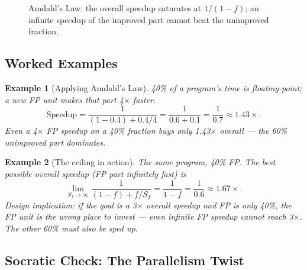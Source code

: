 \documentclass[11pt]{article}
\newtheorem{example}{Example}[section]
\begin{document}
\begin{figure}[h]
  \centering
  \caption{Amdahl's Law: the overall speedup saturates at $1/(1-f)$; an infinite speedup of the improved part cannot beat the unimproved fraction.}
  \label{fig:amdahl}
\end{figure}

\subsection{Worked Examples}

\begin{example}[Applying Amdahl's Law]
40\% of a program's time is floating-point; a new FP unit makes that part 4$\times$ faster.
\[
  \text{Speedup} = \frac{1}{(1-0.4) + 0.4/4} = \frac{1}{0.6 + 0.1} = \frac{1}{0.7}
  \approx 1.43\times.
\]
Even a 4$\times$ FP speedup on a 40\% fraction buys only 1.43$\times$ overall --- the 60\% unimproved part dominates.
\end{example}

\begin{example}[The ceiling in action]
The same program, 40\% FP. The best possible overall speedup (FP part infinitely fast) is
\[
  \lim_{S_f\to\infty} \frac{1}{(1-f) + f/S_f} = \frac{1}{1-f} = \frac{1}{0.6}
  \approx 1.67\times.
\]
Design implication: if the goal is a 3$\times$ overall speedup and FP is only 40\%, the FP unit is the \emph{wrong place to invest} --- even infinite FP speedup cannot reach 3$\times$. The other 60\% must also be sped up.
\end{example}

\subsection{Socratic Check: The Parallelism Twist}
\end{document}
